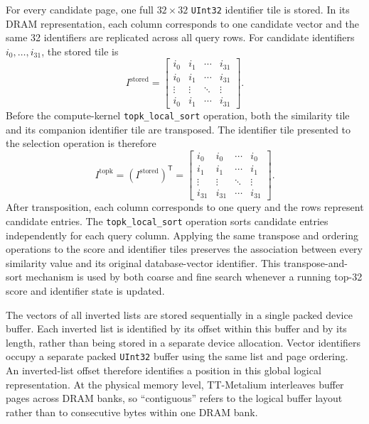 For every candidate page, one full \(32\times32\) \texttt{UInt32} identifier tile is stored. In its DRAM representation, each column corresponds to one candidate vector and the same 32 identifiers are replicated across all query rows. For candidate identifiers \(i_0,\ldots,i_{31}\), the stored tile is
\begin{equation}
I^{\mathrm{stored}}=
\begin{bmatrix}
i_0 & i_1 & \cdots & i_{31}\\
i_0 & i_1 & \cdots & i_{31}\\
\vdots & \vdots & \ddots & \vdots\\
i_0 & i_1 & \cdots & i_{31}
\end{bmatrix}.
\label{eq:identifier-tile}
\end{equation}
Before the compute-kernel \texttt{topk\_local\_sort} operation, both the similarity tile and its companion identifier tile are transposed. The identifier tile presented to the selection operation is therefore
\begin{equation}
I^{\mathrm{topk}}
=
\left(I^{\mathrm{stored}}\right)^{\mathsf T}
=
\begin{bmatrix}
i_0 & i_0 & \cdots & i_0\\
i_1 & i_1 & \cdots & i_1\\
\vdots & \vdots & \ddots & \vdots\\
i_{31} & i_{31} & \cdots & i_{31}
\end{bmatrix}.
\label{eq:identifier-tile-topk}
\end{equation}
After transposition, each column corresponds to one query and the rows represent candidate entries. The \texttt{topk\_local\_sort} operation sorts candidate entries independently for each query column. Applying the same transpose and ordering operations to the score and identifier tiles preserves the association between every similarity value and its original database-vector identifier. This transpose-and-sort mechanism is used by both coarse and fine search whenever a running top-32 score and identifier state is updated.

The vectors of all inverted lists are stored sequentially in a single packed device buffer. Each inverted list is identified by its offset within this buffer and by its length, rather than being stored in a separate device allocation. Vector identifiers occupy a separate packed \texttt{UInt32} buffer using the same list and page ordering. An inverted-list offset therefore identifies a position in this global logical representation. At the physical memory level, TT-Metalium interleaves buffer pages across DRAM banks, so ``contiguous'' refers to the logical buffer layout rather than to consecutive bytes within one DRAM bank.

